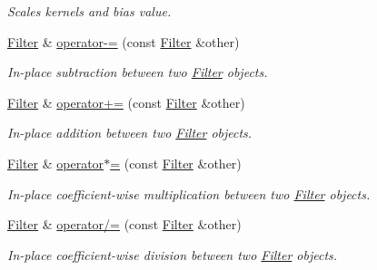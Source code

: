 \begin{DoxyCompactItemize}
\begin{DoxyCompactList}\small\item\em Scales kernels and bias value. \end{DoxyCompactList}\item 
\hyperlink{classffnn_1_1layer_1_1convolution_1_1_filter}{Filter} \& \hyperlink{classffnn_1_1layer_1_1convolution_1_1_filter_ad25eed8e7ffa78ff50fb3318cef81de5}{operator-\/=} (const \hyperlink{classffnn_1_1layer_1_1convolution_1_1_filter}{Filter} \&other)
\begin{DoxyCompactList}\small\item\em In-\/place subtraction between two \hyperlink{classffnn_1_1layer_1_1convolution_1_1_filter}{Filter} objects. \end{DoxyCompactList}\item 
\hyperlink{classffnn_1_1layer_1_1convolution_1_1_filter}{Filter} \& \hyperlink{classffnn_1_1layer_1_1convolution_1_1_filter_a49da4098c5d9a8e400a248a564c84ec1}{operator+=} (const \hyperlink{classffnn_1_1layer_1_1convolution_1_1_filter}{Filter} \&other)
\begin{DoxyCompactList}\small\item\em In-\/place addition between two \hyperlink{classffnn_1_1layer_1_1convolution_1_1_filter}{Filter} objects. \end{DoxyCompactList}\item 
\hyperlink{classffnn_1_1layer_1_1convolution_1_1_filter}{Filter} \& \hyperlink{classffnn_1_1layer_1_1convolution_1_1_filter_aaaa1e310acdc9ab2372109b827d4edaa}{operator$\ast$=} (const \hyperlink{classffnn_1_1layer_1_1convolution_1_1_filter}{Filter} \&other)
\begin{DoxyCompactList}\small\item\em In-\/place coefficient-\/wise multiplication between two \hyperlink{classffnn_1_1layer_1_1convolution_1_1_filter}{Filter} objects. \end{DoxyCompactList}\item 
\hyperlink{classffnn_1_1layer_1_1convolution_1_1_filter}{Filter} \& \hyperlink{classffnn_1_1layer_1_1convolution_1_1_filter_afa3ec94a3919f5e844182e991ef972fc}{operator/=} (const \hyperlink{classffnn_1_1layer_1_1convolution_1_1_filter}{Filter} \&other)
\begin{DoxyCompactList}\small\item\em In-\/place coefficient-\/wise division between two \hyperlink{classffnn_1_1layer_1_1convolution_1_1_filter}{Filter} objects. \end{DoxyCompactList}\end{DoxyCompactItemize}
